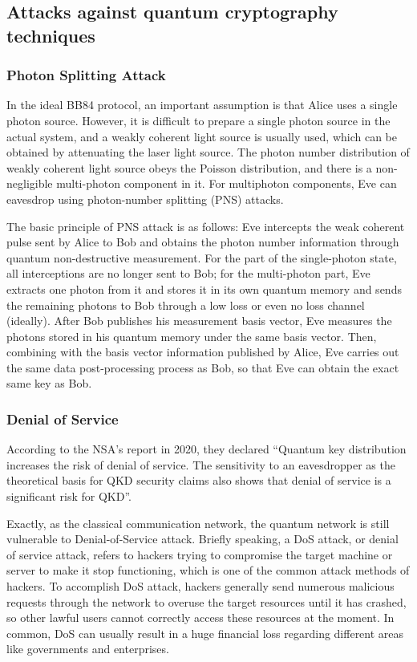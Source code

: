 \documentclass[sigconf]{acmart}
\begin{document}
\subsection{Attacks against quantum cryptography techniques}
\subsubsection{Photon Splitting Attack}
In the ideal BB84 protocol, an important assumption is that Alice uses a single photon source. However, it is difficult to prepare a single photon source in the actual system, and a weakly coherent light source is usually used, which can be obtained by attenuating the laser light source. The photon number distribution of weakly coherent light source obeys the Poisson distribution, and there is a non-negligible multi-photon component in it. For multiphoton components, Eve can eavesdrop using photon-number splitting (PNS) attacks.

The basic principle of PNS attack is as follows: Eve intercepts the weak coherent pulse sent by Alice to Bob and obtains the photon number information through quantum non-destructive measurement. For the part of the single-photon state, all interceptions are no longer sent to Bob; for the multi-photon part, Eve extracts one photon from it and stores it in its own quantum memory and sends the remaining photons to Bob through a low loss or even no loss channel (ideally). After Bob publishes his measurement basis vector, Eve measures the photons stored in his quantum memory under the same basis vector. Then, combining with the basis vector information published by Alice, Eve carries out the same data post-processing process as Bob, so that Eve can obtain the exact same key as Bob\cite{brassard_limitations_2000}.

\subsubsection{Denial of Service}
According to the NSA's report in 2020, they declared “Quantum key distribution increases the risk of denial of service. The sensitivity to an eavesdropper as the theoretical basis for QKD security claims also shows that denial of service is a significant risk for QKD”\cite{national_security_agency_nsa_quantum_nodate}.

Exactly, as the classical communication network, the quantum network is still vulnerable to Denial-of-Service attack. Briefly speaking, a DoS attack, or denial of service attack, refers to hackers trying to compromise the target machine or server to make it stop functioning, which is one of the common attack methods of hackers. To accomplish DoS attack, hackers generally send numerous malicious requests through the network to overuse the target resources until it has crashed, so other lawful users cannot correctly access these resources at the moment. In common, DoS can usually result in a huge financial loss regarding different areas like governments and enterprises\cite{noauthor_what_nodate}.
\end{document}

